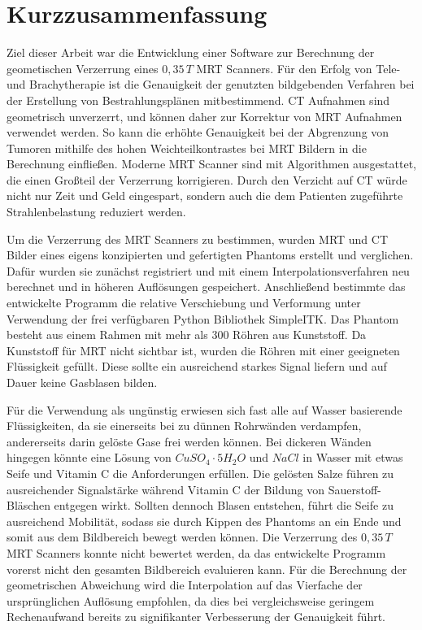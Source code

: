 

\chapter*{Kurzzusammenfassung} 
Ziel dieser Arbeit war die Entwicklung einer Software zur Berechnung der geometischen Verzerrung eines $0,35\, T$ MRT Scanners.
Für den Erfolg von Tele- und Brachytherapie ist die Genauigkeit der genutzten bildgebenden Verfahren bei der Erstellung von Bestrahlungsplänen mitbestimmend.
CT Aufnahmen sind geometrisch unverzerrt, und können daher zur Korrektur von MRT Aufnahmen verwendet werden.
So kann die erhöhte Genauigkeit bei der Abgrenzung von Tumoren mithilfe des hohen Weichteilkontrastes bei MRT Bildern in die Berechnung einfließen.
Moderne MRT Scanner sind mit Algorithmen ausgestattet, die einen Großteil der Verzerrung korrigieren.
Durch den Verzicht auf CT würde nicht nur Zeit und Geld eingespart, sondern auch die dem Patienten zugeführte Strahlenbelastung reduziert werden.

Um die Verzerrung des MRT Scanners zu bestimmen, wurden MRT und CT Bilder eines eigens konzipierten und gefertigten Phantoms erstellt und verglichen.
Dafür wurden sie zunächst registriert und mit einem Interpolationsverfahren neu berechnet und in höheren Auflösungen gespeichert.
Anschließend bestimmte das entwickelte Programm die relative Verschiebung und Verformung unter Verwendung der frei verfügbaren Python Bibliothek {SimpleITK}.
Das Phantom besteht aus einem Rahmen mit mehr als 300 Röhren aus Kunststoff.
Da Kunststoff für MRT nicht sichtbar ist, wurden die Röhren mit einer geeigneten Flüssigkeit gefüllt.
Diese sollte ein ausreichend starkes Signal liefern und auf Dauer keine Gasblasen bilden.

Für die Verwendung als ungünstig erwiesen sich fast alle auf Wasser basierende Flüssigkeiten, da sie einerseits bei zu dünnen Rohrwänden verdampfen, andererseits darin gelöste Gase frei werden können.
Bei dickeren Wänden hingegen könnte eine Lösung von $CuSO_4\cdot5H_2O$ und $NaCl$ in Wasser mit etwas Seife und Vitamin C die Anforderungen erfüllen. Die gelösten Salze führen zu ausreichender Signalstärke während Vitamin C der Bildung von Sauerstoff-Bläschen entgegen wirkt.
Sollten dennoch Blasen entstehen, führt die Seife zu ausreichend Mobilität, sodass sie durch Kippen des Phantoms an ein Ende und somit aus dem Bildbereich bewegt werden können.
Die Verzerrung des $0,35\, T$ MRT Scanners konnte nicht bewertet werden, da das entwickelte Programm vorerst nicht den gesamten Bildbereich evaluieren kann.
Für die Berechnung der geometrischen Abweichung wird die Interpolation auf das Vierfache der ursprünglichen Auflösung empfohlen, da dies bei vergleichsweise geringem Rechenaufwand bereits zu signifikanter Verbesserung der Genauigkeit führt.


